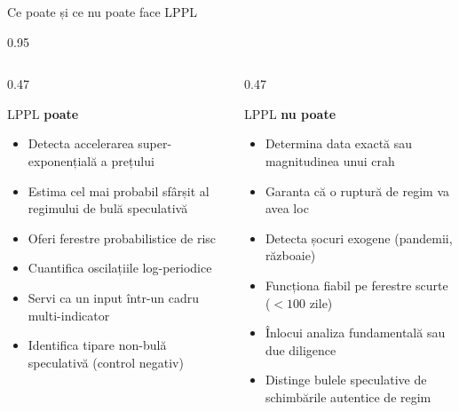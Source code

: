 \documentclass[9pt, aspectratio=169, t]{beamer}
\begin{document}
\begin{frame}{Ce poate și ce nu poate face LPPL}
    \begin{cminipage}{0.95\textwidth}
    {\footnotesize
    \begin{columns}[T]
        \begin{column}{0.47\textwidth}
            \begin{exampleblock}{LPPL \textbf{poate}}
                \begin{itemize}\setlength{\itemsep}{0pt}
                    \item Detecta accelerarea super-exponențială a prețului
                    \item Estima cel mai probabil sfârșit al regimului de bulă speculativă
                    \item Oferi ferestre probabilistice de risc
                    \item Cuantifica oscilațiile log-periodice
                    \item Servi ca un input într-un cadru multi-indicator
                    \item Identifica tipare non-bulă speculativă (control negativ)
                \end{itemize}
            \end{exampleblock}
        \end{column}
        \begin{column}{0.47\textwidth}
            \begin{alertblock}{LPPL \textbf{nu poate}}
                \begin{itemize}\setlength{\itemsep}{0pt}
                    \item Determina data exactă sau magnitudinea unui crah
                    \item Garanta că o ruptură de regim va avea loc
                    \item Detecta șocuri exogene (pandemii, războaie)
                    \item Funcționa fiabil pe ferestre scurte ($< 100$ zile)
                    \item Înlocui analiza fundamentală sau due diligence
                    \item Distinge bulele speculative de schimbările autentice de regim
                \end{itemize}
            \end{alertblock}
        \end{column}
    \end{columns}
}
\end{cminipage}
\end{frame}
\end{document}
